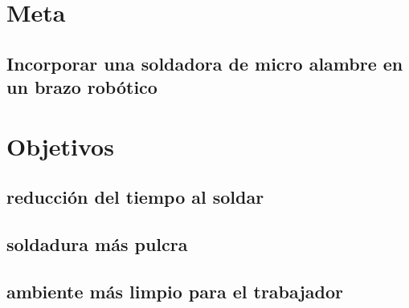 \documentclass[12pt,letterpaper]{article}
\begin{document}
\section*{Meta}

\subsection*{Incorporar una soldadora de micro alambre en un brazo robótico}

\section*{Objetivos}
\subsection{reducción del tiempo al soldar}
\subsection{soldadura más pulcra}
\subsection{ambiente más limpio para el trabajador}
\end{document}
